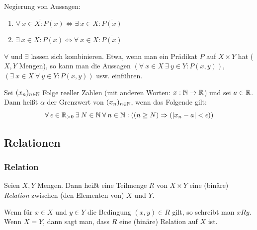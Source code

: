 \begin{bem}
	Negierung von Aussagen:
	\begin{enumerate}
		\item $ \overline{\forall\: x \in X : P(x)} \Leftrightarrow \exists\: x \in X : \overline{P(x)} $
		\item $ \overline{\exists\: x \in X : P(x)} \Leftrightarrow \forall\: x \in X : \overline{P(x)} $
	\end{enumerate}
\end{bem}

\begin{bem}
	$ \forall $ und $ \exists $ lassen sich kombinieren. Etwa, wenn man ein Prädikat $ P $ auf $ X \times Y $ hat ($ X,Y $ Mengen), so kann man die Aussagen $ \left( \forall\: x \in X \:\exists\: y \in Y : P(x,y) \right) $, $ \left( \exists\: x \in X \:\forall\: y \in Y : P(x,y) \right) $ usw. einführen.
\end{bem}

\begin{bsp}
	Sei $ (x_n)_{n \in \mathbb N} $ Folge reeller Zahlen (mit anderen Worten: $ x : \mathbb N \to \mathbb R $) und sei $ a\in \mathbb R $. Dann heißt $ \alpha $ der Grenzwert von $ (x_n)_{n \in \mathbb N} $, wenn das Folgende gilt:
	\begin{equation*}
		\forall\: \epsilon \in \mathbb R_{>0} \:\exists\: N \in \mathbb N \:\forall\: n \in \mathbb N: \left( (n \geq N) \Rightarrow (|x_n - a| < \epsilon) \right)
	\end{equation*}
\end{bsp} 

\clearpage
\subsection{Relationen}

\subsubsection{Relation}

Seien $ X,Y $ Mengen. Dann heißt eine Teilmenge $ R $ von $ X \times Y $ eine (binäre) \emph{Relation} zwischen (den Elementen von) $ X $ und $ Y $.

Wenn für $ x \in X $ und $ y \in Y $ die Bedingung $ (x,y) \in R $ gilt, so schreibt man $ x R y $. Wenn $ X = Y $, dann sagt man, dass $ R $ eine (binäre) Relation auf $ X $ ist.

